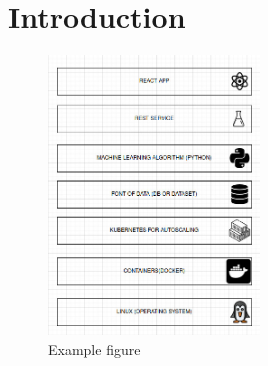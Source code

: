\section{Introduction}
\begin{figure}[H]
    \centering
    \includegraphics[width=0.5\textwidth]{assets/index.jpg}
    \caption{Example figure}
    \label{fig:example}
  \end{figure}
